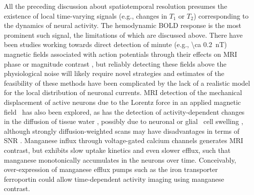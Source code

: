 All the preceding discussion about spatiotemporal resolution presumes the existence of local time-varying signals (e.g., changes in $T_1$ or $T_2$) corresponding to the dynamics of neural activity.
The hemodynamic BOLD response is the most prominent such signal, the limitations of which are discussed above. There have been studies working towards direct detection of minute (e.g., \SI{\ca 0.2}{\nano\tesla}) magnetic fields associated with action potentials through their effects on MRI phase or magnitude contrast \cite{Bodurka2002, petridou2006direct}, but reliably detecting these fields above the physiological noise will likely require novel strategies \cite{witzel2008stimulus, halpern2010magnetic} and estimates of the feasibility of these methods have been complicated by the lack of a realistic model for the local distribution of neuronal currents. MRI detection of the mechanical displacement of active neurons due to the Lorentz force in an applied magnetic field~\cite{roth2009mechanical} has also been explored, as has the detection of activity-dependent changes in the diffusion of tissue water \cite{tsurugizawa2013water,le2006direct}, possibly due to neuronal or glial~\cite{kitaura2009activity} cell swelling \cite{isokawa2005n, holthoff1996intrinsic}, although strongly diffusion-weighted scans may have disadvantages in terms of SNR \cite{jasanoff2007bloodless}. Manganese influx through voltage-gated calcium channels \cite{lin1997manganese, van2002vivo} generates MRI contrast, but exhibits slow uptake kinetics and even slower efflux, such that manganese  monotonically accumulates in the neurons over time. Conceivably, over-expression of manganese efflux pumps such as the iron transporter ferroportin \cite{madejczyk2012iron} could allow time-dependent activity imaging using manganese contrast.

